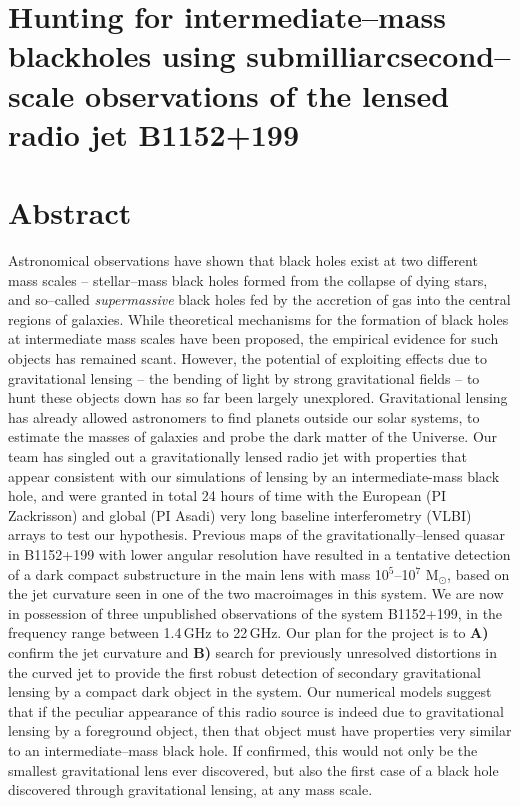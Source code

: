 \documentclass[a4paper, 11pt]{article}
\begin{document}
\section*{Hunting for intermediate--mass blackholes using submilliarcsecond--scale observations of the lensed radio jet B1152+199}
\section{Abstract}
Astronomical observations have shown that black holes exist at two different mass scales -- stellar--mass black holes formed from the collapse of dying stars, and so--called {\it supermassive} black holes fed by the accretion of gas into the central regions of galaxies. While theoretical mechanisms for the formation of black holes at intermediate mass scales have been proposed, the empirical evidence for such objects has remained scant. However, the potential of exploiting effects due to gravitational lensing -- the bending of light by strong gravitational fields -- to hunt these objects down has so far been largely unexplored.
Gravitational lensing has already allowed astronomers to find planets outside our solar systems, to estimate the masses of galaxies and probe the dark matter of the Universe. Our team has singled out a gravitationally lensed radio jet with properties that appear consistent with our simulations of lensing by an intermediate-mass black hole, and were granted in total 24 hours of time with the European (PI Zackrisson) and global (PI Asadi) very long baseline interferometry (VLBI) arrays to test our hypothesis. Previous maps of the gravitationally--lensed quasar in B1152+199 with lower angular resolution have resulted in a tentative detection of a dark compact substructure in the main lens with mass 10$^5$--10$^7$ M$_\odot$, based on the jet curvature seen in one of the two macroimages in this system. We are now in possession of three unpublished observations of the system B1152+199, in the frequency range between 1.4\,GHz to 22\,GHz. Our plan for the project is to {\bf A)} confirm the jet curvature and {\bf B)} search for previously unresolved distortions in the curved jet to provide the first robust detection of secondary gravitational lensing by a compact dark object in the system. Our numerical models suggest that if the peculiar appearance of this radio source is indeed due to gravitational lensing by a foreground object, then that object must have properties very similar to an intermediate--mass black hole. If confirmed, this would not only be the smallest gravitational lens ever discovered, but also the first case of a black hole discovered through gravitational lensing, at any mass scale.
\end{document}
